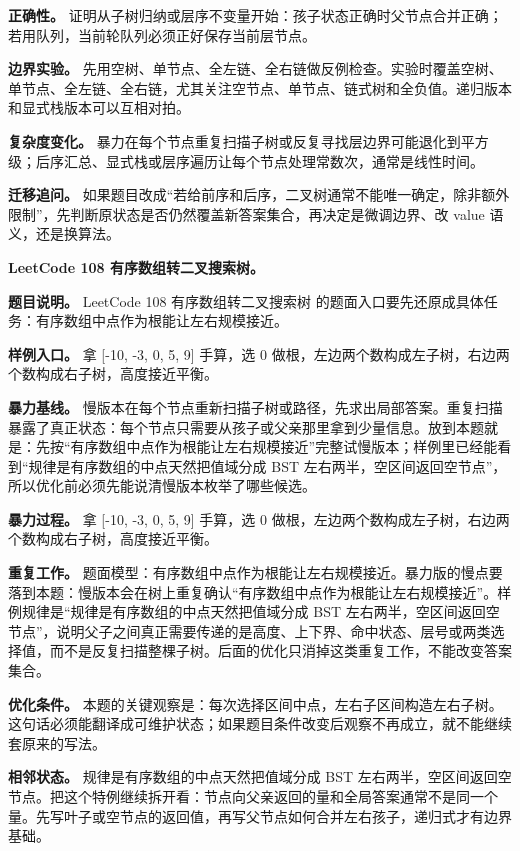\textbf{正确性。} 证明从子树归纳或层序不变量开始：孩子状态正确时父节点合并正确；若用队列，当前轮队列必须正好保存当前层节点。

\textbf{边界实验。} 先用空树、单节点、全左链、全右链做反例检查。实验时覆盖空树、单节点、全左链、全右链，尤其关注空节点、单节点、链式树和全负值。递归版本和显式栈版本可以互相对拍。

\textbf{复杂度变化。} 暴力在每个节点重复扫描子树或反复寻找层边界可能退化到平方级；后序汇总、显式栈或层序遍历让每个节点处理常数次，通常是线性时间。

\textbf{迁移追问。} 如果题目改成“若给前序和后序，二叉树通常不能唯一确定，除非额外限制”，先判断原状态是否仍然覆盖新答案集合，再决定是微调边界、改 value 语义，还是换算法。

\noindent\textbf{LeetCode 108 有序数组转二叉搜索树。}

\textbf{题目说明。} LeetCode 108 有序数组转二叉搜索树 的题面入口要先还原成具体任务：有序数组中点作为根能让左右规模接近。

\textbf{样例入口。} 拿 [-10, -3, 0, 5, 9] 手算，选 0 做根，左边两个数构成左子树，右边两个数构成右子树，高度接近平衡。

\textbf{暴力基线。} 慢版本在每个节点重新扫描子树或路径，先求出局部答案。重复扫描暴露了真正状态：每个节点只需要从孩子或父亲那里拿到少量信息。放到本题就是：先按“有序数组中点作为根能让左右规模接近”完整试慢版本；样例里已经能看到“规律是有序数组的中点天然把值域分成 BST 左右两半，空区间返回空节点”，所以优化前必须先能说清慢版本枚举了哪些候选。

\textbf{暴力过程。} 拿 [-10, -3, 0, 5, 9] 手算，选 0 做根，左边两个数构成左子树，右边两个数构成右子树，高度接近平衡。

\textbf{重复工作。} 题面模型：有序数组中点作为根能让左右规模接近。暴力版的慢点要落到本题：慢版本会在树上重复确认“有序数组中点作为根能让左右规模接近”。样例规律是“规律是有序数组的中点天然把值域分成 BST 左右两半，空区间返回空节点”，说明父子之间真正需要传递的是高度、上下界、命中状态、层号或两类选择值，而不是反复扫描整棵子树。后面的优化只消掉这类重复工作，不能改变答案集合。

\textbf{优化条件。} 本题的关键观察是：每次选择区间中点，左右子区间构造左右子树。这句话必须能翻译成可维护状态；如果题目条件改变后观察不再成立，就不能继续套原来的写法。

\textbf{相邻状态。} 规律是有序数组的中点天然把值域分成 BST 左右两半，空区间返回空节点。把这个特例继续拆开看：节点向父亲返回的量和全局答案通常不是同一个量。先写叶子或空节点的返回值，再写父节点如何合并左右孩子，递归式才有边界基础。


